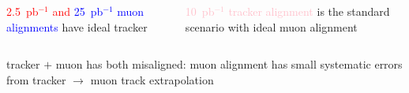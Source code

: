 \documentclass[compress]{beamer}
\begin{document}
\begin{frame}
\begin{columns}
\textcolor{red}{2.5~pb$^{-1}$ and} \textcolor{blue}{25~pb$^{-1}$ muon alignments} have ideal tracker

\vspace{0.3cm}
\textcolor{pink}{10~pb$^{-1}$ tracker alignment} is the standard scenario with ideal muon alignment
\end{columns}

\vspace{0.3cm}
tracker $+$ muon has both misaligned: muon alignment has small systematic errors from tracker $\to$ muon track extrapolation
\end{frame}
\end{document}
